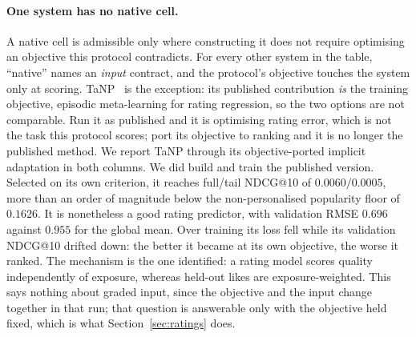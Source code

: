 \documentclass[manuscript,screen,review]{acmart}
\begin{document}
\paragraph{One system has no native cell.}\label{sec:nativelimit} A native cell is admissible only where constructing it does not require optimising an objective this protocol contradicts. For every other system in the table, ``native'' names an \emph{input} contract, and the protocol's objective touches the system only at scoring. TaNP~\citep{lin2021tanp} is the exception: its published contribution \emph{is} the training objective, episodic meta-learning for rating regression, so the two options are not comparable. Run it as published and it is optimising rating error, which is not the task this protocol scores; port its objective to ranking and it is no longer the published method. We report TaNP through its objective-ported implicit adaptation in both columns. We did build and train the published version. Selected on its own criterion, it reaches full/tail NDCG@10 of $0.0060/0.0005$, more than an order of magnitude below the non-personalised popularity floor of $0.1626$. It is nonetheless a good rating predictor, with validation RMSE $0.696$ against $0.955$ for the global mean. Over training its loss fell while its validation NDCG@10 drifted down: the better it became at its own objective, the worse it ranked. The mechanism is the one \citet{cremonesi2010performance} identified: a rating model scores quality independently of exposure, whereas held-out likes are exposure-weighted. This says nothing about graded input, since the objective and the input change together in that run; that question is answerable only with the objective held fixed, which is what Section~\ref{sec:ratings} does.
\end{document}
